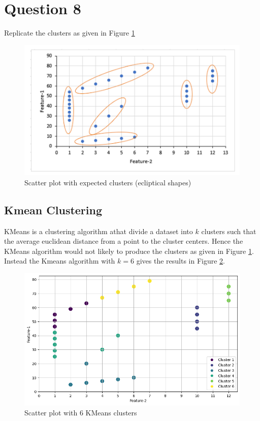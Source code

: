 \section{Question 8}

Replicate the clusters as given in Figure \ref{Fig: Clusters to replicate}

\begin{figure}
    \centering
    \includegraphics[width=\textwidth]{Appendices/scatter_plot.png}
    \caption[]{Scatter plot with expected clusters (ecliptical shapes)}
    \label{Fig: Clusters to replicate}
\end{figure}

\subsection{Kmean Clustering}
KMeans is a  clustering algorithm athat divide a dataset into $k$ clusters such that the average euclidean distance from a point to the cluster centers.
Hence the KMeans algorithm would not likely to produce the clusters as given in Figure \ref{Fig: Clusters to replicate}.
Instead the Kmeans algorithm with $k=6$ gives the results in Figure \ref{Fig: KMeans6}.

\begin{figure}
    \centering
    \includegraphics[width=\textwidth]{Appendices/Kmeans6.png}
    \caption[]{Scatter plot with 6 KMeans clusters}
    \label{Fig: KMeans6}
\end{figure}

